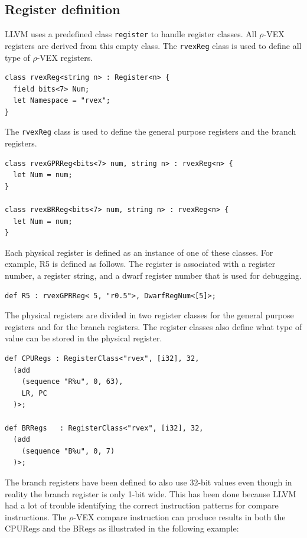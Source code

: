 \subsection{Register definition}
LLVM uses a predefined class \texttt{register} to handle register classes. All $\rho$-VEX registers are derived from this empty class. The \texttt{rvexReg} class is used to define all type of $\rho$-VEX registers. 

\begin{lstlisting}[language=tblgen]
class rvexReg<string n> : Register<n> {
  field bits<7> Num;
  let Namespace = "rvex";
}
\end{lstlisting}

\pagebreak

The \texttt{rvexReg} class is used to define the general purpose registers and the branch registers.
\begin{lstlisting}[language=tblgen]
class rvexGPRReg<bits<7> num, string n> : rvexReg<n> {
  let Num = num;
}

class rvexBRReg<bits<7> num, string n> : rvexReg<n> {
  let Num = num;
}
\end{lstlisting}

Each physical register is defined as an instance of one of these classes. For example, R5 is defined as follows. The register is associated with a register number, a register string, and a dwarf register number that is used for debugging.

\begin{lstlisting}[language=tblgen]
def R5 : rvexGPRReg< 5, "r0.5">, DwarfRegNum<[5]>;
\end{lstlisting}

The physical registers are divided in two register classes for the general purpose registers and for the branch registers. The register classes also define what type of value can be stored in the physical register.

\begin{lstlisting}[language=tblgen]
def CPURegs : RegisterClass<"rvex", [i32], 32, 
  (add
    (sequence "R%u", 0, 63),
    LR, PC
  )>;

def BRRegs   : RegisterClass<"rvex", [i32], 32, 
  (add 
    (sequence "B%u", 0, 7)
  )>;
\end{lstlisting}

The branch registers have been defined to also use 32-bit values even though in reality the branch register is only 1-bit wide. This has been done because LLVM had a lot of trouble identifying the correct instruction patterns for compare instructions. The $\rho$-VEX compare instruction can produce results in both the CPURegs and the BRegs as illustrated in the following example:

